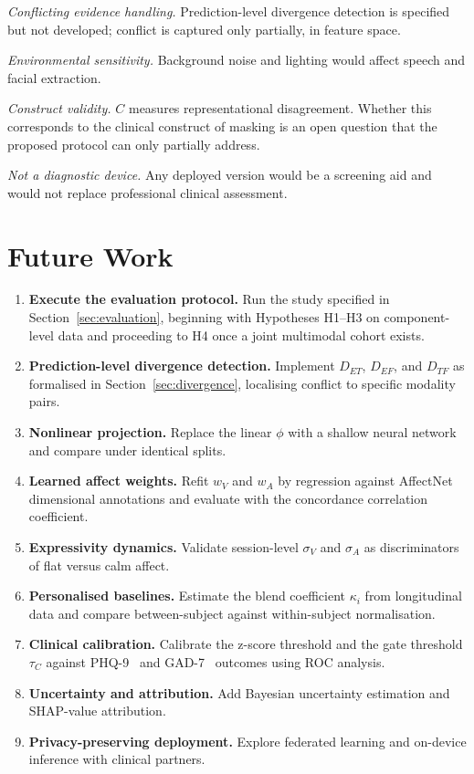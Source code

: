 \documentclass[12pt]{article}
\begin{document}
\emph{Conflicting evidence handling.} Prediction-level divergence
detection is specified but not developed; conflict is captured only
partially, in feature space.

\emph{Environmental sensitivity.} Background noise and lighting would
affect speech and facial extraction.

\emph{Construct validity.} $C$ measures representational disagreement.
Whether this corresponds to the clinical construct of masking is an
open question that the proposed protocol can only partially address.

\emph{Not a diagnostic device.} Any deployed version would be a
screening aid and would not replace professional clinical assessment.

\section{Future Work}
\label{sec:future}

\begin{enumerate}
  \item \textbf{Execute the evaluation protocol.} Run the study
        specified in Section~\ref{sec:evaluation}, beginning with
        Hypotheses H1--H3 on component-level data and proceeding to H4
        once a joint multimodal cohort exists.
  \item \textbf{Prediction-level divergence detection.} Implement
        $D_{ET}$, $D_{EF}$, and $D_{TF}$ as formalised in
        Section~\ref{sec:divergence}, localising conflict to specific
        modality pairs.
  \item \textbf{Nonlinear projection.} Replace the linear $\phi$ with a
        shallow neural network and compare under identical splits.
  \item \textbf{Learned affect weights.} Refit $w_V$ and $w_A$ by
        regression against AffectNet dimensional annotations and
        evaluate with the concordance correlation coefficient.
  \item \textbf{Expressivity dynamics.} Validate session-level
        $\sigma_V$ and $\sigma_A$ as discriminators of flat versus calm
        affect.
  \item \textbf{Personalised baselines.} Estimate the blend coefficient
        $\kappa_i$ from longitudinal data and compare
        between-subject against within-subject normalisation.
  \item \textbf{Clinical calibration.} Calibrate the z-score threshold
        and the gate threshold $\tau_C$ against PHQ-9~\cite{kroenke2001phq9}
        and GAD-7~\cite{spitzer2006gad7} outcomes using ROC analysis.
  \item \textbf{Uncertainty and attribution.} Add Bayesian uncertainty
        estimation and SHAP-value attribution.
  \item \textbf{Privacy-preserving deployment.} Explore federated
        learning and on-device inference with clinical partners.
\end{enumerate}
\end{document}
